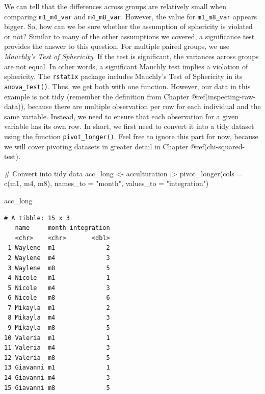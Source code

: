 \documentclass[
  letterpaper,
]{krantz}
\makeatletter
\newenvironment{Shaded}{\begin{snugshade}}{\end{snugshade}}
\newcommand{\AttributeTok}[1]{\textcolor[rgb]{0.40,0.45,0.13}{#1}}
\newcommand{\CommentTok}[1]{\textcolor[rgb]{0.37,0.37,0.37}{#1}}
\newcommand{\FunctionTok}[1]{\textcolor[rgb]{0.28,0.35,0.67}{#1}}
\newcommand{\NormalTok}[1]{\textcolor[rgb]{0.00,0.23,0.31}{#1}}
\newcommand{\OtherTok}[1]{\textcolor[rgb]{0.00,0.23,0.31}{#1}}
\newcommand{\SpecialCharTok}[1]{\textcolor[rgb]{0.37,0.37,0.37}{#1}}
\newcommand{\StringTok}[1]{\textcolor[rgb]{0.13,0.47,0.30}{#1}}
\newenvironment{kframe}{%
\medskip{}
\setlength{\fboxsep}{.8em}
 \def\at@end@of@kframe{}%
 \ifinner\ifhmode%
  \def\at@end@of@kframe{\end{minipage}}%
  \begin{minipage}{\columnwidth}%
 \fi\fi%
 \def\FrameCommand##1{\hskip\@totalleftmargin \hskip-\fboxsep
 \colorbox{shadecolor}{##1}\hskip-\fboxsep
     \hskip-\linewidth \hskip-\@totalleftmargin \hskip\columnwidth}%
 \MakeFramed {\advance\hsize-\width
   \@totalleftmargin\z@ \linewidth\hsize
   \@setminipage}}%
 {\par\unskip\endMakeFramed%
 \at@end@of@kframe}
\renewenvironment{Shaded}{\begin{kframe}}{\end{kframe}}
\makeatother
\begin{document}
We can tell that the differences across groups are relatively small when
comparing \texttt{m1\_m4\_var} and \texttt{m4\_m8\_var}. However, the
value for \texttt{m1\_m8\_var} appears bigger. So, how can we be sure
whether the assumption of sphericity is violated or not? Similar to many
of the other assumptions we covered, a significance test provides the
answer to this question. For multiple paired groups, we use
\emph{Mauchly's Test of Sphericity}. If the test is significant, the
variances across groups are not equal. In other words, a significant
Mauchly test implies a violation of sphericity. The \texttt{rstatix}
package includes Mauchly's Test of Sphericity in its
\texttt{anova\_test()}. Thus, we get both with one function. However,
our data in this example is not tidy (remember the definition from
Chapter @ref(inspecting-raw-data)), because there are multiple
observation per row for each individual and the same variable. Instead,
we need to ensure that each observation for a given variable has its own
row. In short, we first need to convert it into a tidy dataset using the
function \texttt{pivot\_longer()}. Feel free to ignore this part for
now, because we will cover pivoting datasets in greater detail in
Chapter @ref(chi-squared-test).

\begin{Shaded}
\begin{Highlighting}[]
\CommentTok{\# Convert into tidy data}
\NormalTok{acc\_long }\OtherTok{\textless{}{-}}
\NormalTok{  acculturation }\SpecialCharTok{|\textgreater{}}
  \FunctionTok{pivot\_longer}\NormalTok{(}\AttributeTok{cols =} \FunctionTok{c}\NormalTok{(m1, m4, m8),}
               \AttributeTok{names\_to =} \StringTok{"month"}\NormalTok{,}
               \AttributeTok{values\_to =} \StringTok{"integration"}\NormalTok{)}

\NormalTok{acc\_long}
\end{Highlighting}
\end{Shaded}

\begin{verbatim}
# A tibble: 15 x 3
   name     month integration
   <chr>    <chr>       <dbl>
 1 Waylene  m1              2
 2 Waylene  m4              3
 3 Waylene  m8              5
 4 Nicole   m1              1
 5 Nicole   m4              3
 6 Nicole   m8              6
 7 Mikayla  m1              2
 8 Mikayla  m4              3
 9 Mikayla  m8              5
10 Valeria  m1              1
11 Valeria  m4              3
12 Valeria  m8              5
13 Giavanni m1              1
14 Giavanni m4              3
15 Giavanni m8              5
\end{verbatim}
\end{document}
